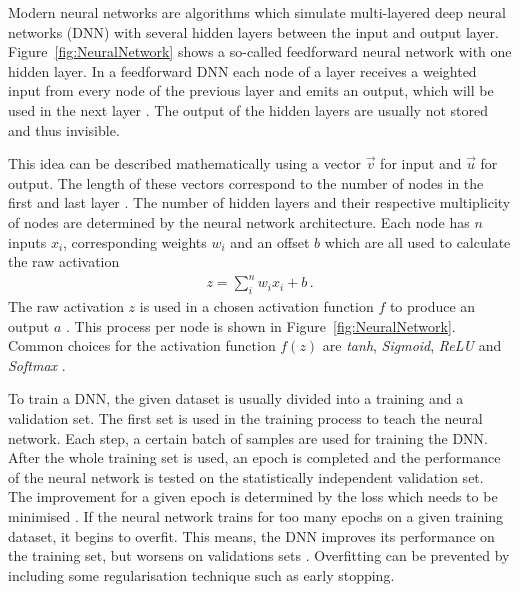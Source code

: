 \documentclass[bachelor,oneside, BCOR10mm,
			ngerman,english  %
]{GAUBM}
\begin{document}
Modern neural networks are algorithms which simulate multi-layered deep neural networks (DNN) with several hidden layers between the input and output layer. Figure~\ref{fig:NeuralNetwork} shows a so-called feedforward neural network with one hidden layer. In a feedforward DNN each node of a layer receives a weighted input from every node of the previous layer and emits an output, which will be used in the next layer \cite{nn_nodecalculation}. The output of the hidden layers are usually not stored and thus invisible.

This idea can be described mathematically using a vector $\vec{v}$ for input and $\vec{u}$ for output. The length of these vectors correspond to the number of nodes in the first and last layer \cite{nn_nodecalculation}. The number of hidden layers and their respective multiplicity of nodes are determined by the neural network architecture. Each node has $n$ inputs $x_i$, corresponding weights $w_i$ and an offset $b$ which are all used to calculate the raw activation
\begin{align}
	z = \sum_i^n w_ix_i + b\,.
\end{align}
The raw activation $z$ is used in a chosen activation function $f$ to produce an output $a$ \cite{nn_nodecalculation}. This process per node is shown in Figure~\ref{fig:NeuralNetwork}. Common choices for the activation function $f(z)$ are \textit{tanh}, \textit{Sigmoid}, \textit{ReLU} and \textit{Softmax} \cite{nn_activationfunction}. 

To train a DNN, the given dataset is usually divided into a training and a validation set. The first set is used in the training process to teach the neural network. Each step, a certain batch of samples are used for training the DNN. After the whole training set is used, an epoch is completed and the performance of the neural network is tested on the statistically independent validation set. The improvement for a given epoch is determined by the loss which needs to be minimised \cite{nn_overfitting}. If the neural network trains for too many epochs on a given training dataset, it begins to overfit. This means, the DNN improves its performance on the training set, but worsens on validations sets \cite{nn_overfitting}. Overfitting can be prevented by including some regularisation technique such as early stopping. 
\end{document}
